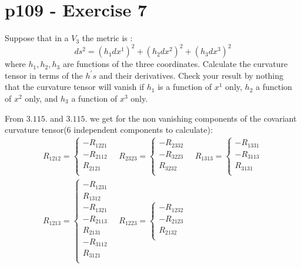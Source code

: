 \section{p109 - Exercise 7}
\begin{tcolorbox}
Suppose that in a $V_3$ the metric is :$$ ds^2= (h_1dx^1)^2+(h_2dx^2)^2+(h_3dx^3)^2$$ where $h_1, h_2, h_3$ are functions of the three coordinates. Calculate the curvature  tensor in terms of the $h^{'}s$ and their derivatives. Check your result by nothing that the curvature tensor will vanish if $h_1$ is a function of $x^1$ only, $h_2$ a function of $x^2$ only, and $h_3$  a function of $x^3$ only.
\end{tcolorbox}
From $\mathbf{3.115.}$ and $\mathbf{3.115.}$ we get for the non vanishing components of the covariant curvature tensor($6$ independent components to calculate):
\begin{align*}
R_{1212} =\left\{ \begin{array}{c}
- R_{1221} \\
- R_{2112} \\
 R_{2121} \\
\end{array}\right.  \quad R_{2323} =\left\{ \begin{array}{c}
- R_{2332} \\
- R_{3223} \\
 R_{3232} \\
\end{array}\right.  \quad R_{1313} =\left\{ \begin{array}{c}
- R_{1331} \\
- R_{3113} \\
 R_{3131} \\
\end{array}\right.  \\
R_{1213} =\left\{ \begin{array}{c}
- R_{1231} \\
 R_{1312} \\
 -R_{1321} \\
- R_{2113} \\
 R_{2131} \\
 -R_{3112} \\
 R_{3121} \\
\end{array}\right.  \quad
R_{1223} =\left\{ \begin{array}{c}
- R_{1232} \\
- R_{2123} \\
 R_{2132} \\

\end{array}
\end{align*}
